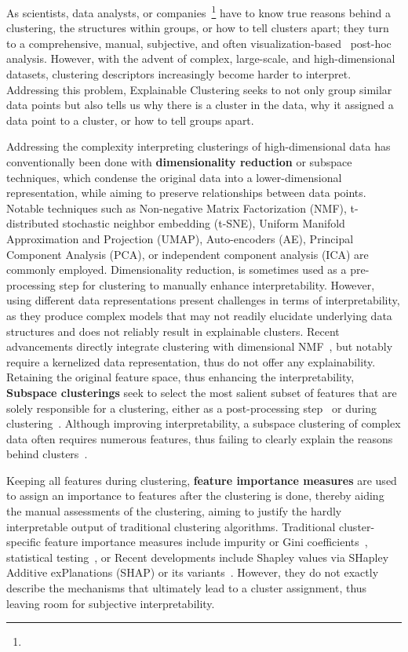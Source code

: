 \documentclass[a4paper,11pt]{article}
\begin{document}
As scientists, data analysts, or companies~\footnote{} have to know true reasons behind a clustering, 
the structures within groups, or how to tell clusters apart; 
they turn to a comprehensive, manual, subjective, and often visualization-based~\cite{todo} post-hoc analysis.
However, with the advent of complex, large-scale, and high-dimensional datasets, 
clustering descriptors increasingly become harder to interpret. 
Addressing this problem, Explainable Clustering seeks to not only group similar data points but also tells us 
why there is a cluster in the data,
why it assigned a data point to a cluster, or 
how to tell groups apart.

Addressing the complexity interpreting clusterings of high-dimensional data has conventionally been done with \textbf{dimensionality reduction} or subspace techniques, which condense the original data into a lower-dimensional representation, while aiming to preserve relationships between data points. 
Notable techniques such as Non-negative Matrix Factorization (NMF), t-distributed stochastic neighbor embedding (t-SNE), Uniform Manifold Approximation and Projection (UMAP), Auto-encoders (AE), Principal Component Analysis (PCA), or independent component analysis (ICA) are commonly employed. 
Dimensionality reduction, is sometimes used as a pre-processing step for clustering to manually enhance interpretability.
However, using different data representations present challenges in terms of interpretability, as they produce complex models that may not readily elucidate underlying data structures and does not reliably result in explainable clusters.
Recent advancements directly integrate clustering with dimensional NMF~\cite{}, but notably require a kernelized data representation, thus do not offer any explainability. 
Retaining the original feature space, thus enhancing the interpretability,
\textbf{Subspace clusterings} seek to select the most salient subset of features that are solely responsible for a clustering, either as a post-processing step~\cite{todo} or during clustering~\cite{todo}.
Although improving interpretability, a subspace clustering of complex data often requires numerous features, thus failing to clearly explain the reasons behind clusters~\cite{todo}. 

Keeping all features during clustering, \textbf{feature importance measures} are used to assign an importance to features after the clustering is done, 
thereby aiding the manual assessments of the clustering,
aiming to justify the hardly interpretable output of traditional clustering algorithms.   
Traditional cluster-specific feature importance measures include impurity or Gini coefficients~\cite{todo}, statistical testing~\cite{todo}, or 
Recent developments include Shapley values via SHapley Additive exPlanations (SHAP) or its variants~\cite{todo}.
However, they do not exactly describe the mechanisms that ultimately lead to a cluster assignment, 
thus leaving room for subjective interpretability.
\end{document}
